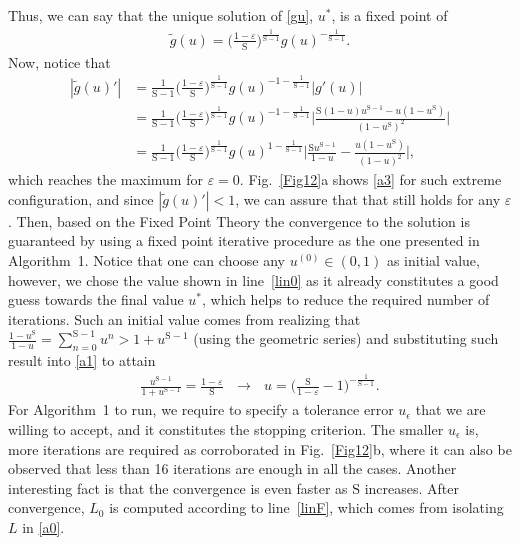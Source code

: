 \documentclass[10pt,journal,a4paper]{IEEEtran}
\begin{document}
%
%
	Thus, we can say that the unique solution of \eqref{gu}, $u^*$, is a fixed point of
	\begin{align}
	\tilde{g}(u)=\Big(\frac{1-\varepsilon}{\mathrm{S}}\Big)^{\frac{1}{\mathrm{S}-1}}g(u)^{-\frac{1}{\mathrm{S}-1}}.\label{gu2}
	\end{align}
	Now, notice that
	\begin{align}
	|\tilde{g}(u)'|&=\frac{1}{\mathrm{S}-1}\Big(\frac{1-\varepsilon}{\mathrm{S}}\Big)^{\frac{1}{\mathrm{S}-1}}g(u)^{-1-\frac{1}{\mathrm{S}-1}}|g'(u)|\nonumber\\
	&=\!\frac{1}{\mathrm{S}\!-\!1}\!\Big(\!\frac{1\!-\!\varepsilon}{\mathrm{S}}\!\Big)^{\frac{1}{\mathrm{S}\!-\!1}}\!\!g(u)^{-\!1\!-\!\frac{1}{\mathrm{S}\!-\!1}}\Bigg|\frac{\mathrm{S}(1\!-\!u)u^{\mathrm{S}\!-\!1}\!\!-\!u(1\!-\!u^\mathrm{S})}{(1-u^\mathrm{S})^2}\Bigg|\nonumber\\
	&=\!\frac{1}{\mathrm{S}\!-\!1}\!\Big(\frac{1\!-\!\varepsilon}{\mathrm{S}}\Big)^{\frac{1}{\mathrm{S}\!-\!1}}\!\!g(u)^{1\!-\!\frac{1}{\mathrm{S}\!-\!1}}\!\bigg|\frac{\mathrm{S}u^{\mathrm{S}\!-\!1}}{1-u}\!-\!\frac{u(1\!-\!u^{\mathrm{S}})}{(1-u)^2}\bigg|,\label{a3}
	\end{align}
	which reaches the maximum for $\varepsilon=0$. Fig.~\ref{Fig12}a shows \eqref{a3} for such extreme configuration, and since $|\tilde{g}(u)'| < 1$, we can assure that that still holds for any $\varepsilon$. Then, based on the Fixed Point Theory \cite{Agarwal.2001} the convergence to the solution is guaranteed by using a fixed point iterative procedure as the one presented in Algorithm~1. Notice that  one can choose any $u^{(0)}\in(0,1)$ as initial value, however, we chose the value shown in line~\ref{lin0} as it already constitutes a good guess towards the final value $u^*$, which helps to reduce the required number of iterations. Such an initial value comes from realizing that $\frac{1-u^\mathrm{S}}{1-u}=\sum_{n=0}^{\mathrm{S}-1}u^n>1+u^{\mathrm{S}-1}$ (using the geometric series) and substituting such result into \eqref{a1} to attain
\begin{align}
\frac{u^{\mathrm{S}-1}}{1+u^{\mathrm{S}-1}}=\frac{1-\varepsilon}{\mathrm{S}}\ \ \ \rightarrow\ \ \
u=\Big(\frac{\mathrm{S}}{1-\varepsilon}-1\Big)^{-\frac{1}{\mathrm{S}-1}}.
\end{align}
	For Algorithm~1 to run, we require to specify a tolerance error $u_\epsilon$ that we are willing to accept, and it constitutes the stopping criterion. The smaller  $u_\epsilon$ is, more iterations are required as corroborated in Fig.~\ref{Fig12}b, where it can also be observed that less than 16 iterations are enough in all the cases. Another interesting fact is that the convergence is even faster as $\mathrm{S}$ increases. After convergence, $L_0$ is computed according to line~\ref{linF}, which comes from isolating $L$ in \eqref{a0}. \hfill 	\qedsymbol
	
\end{document}
